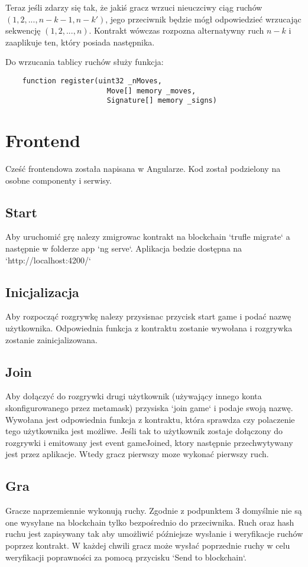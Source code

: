 \documentclass[a4paper, 12pt, onecolumn, one]{article}
\renewenvironment{thebibliography}[1]{%
\begin{oldthebibliography}{#1}%
\setlength{\parskip}{0ex}%
\setlength{\itemsep}{0.5ex} }%
{ \end{oldthebibliography} }
\begin{document}
	Teraz jeśli zdarzy się tak, że jakiś gracz wrzuci nieuczciwy ciąg ruchów \mbox{$(1,2,...,n-k-1,n-k')$}, jego przeciwnik będzie mógł odpowiedzieć wrzucając sekwencję \mbox{$(1,2,...,n)$}. Kontrakt wówczas rozpozna alternatywny ruch $n-k$ i zaaplikuje ten, który posiada następnika.
	
	Do wrzucania tablicy ruchów służy funkcja:
	\begin{lstlisting}
    function register(uint32 _nMoves,
                        Move[] memory _moves,
                        Signature[] memory _signs)
	\end{lstlisting}
 	
\section{Frontend}
	Cześć frontendowa została napisana w Angularze. Kod został podzielony na osobne componenty i serwisy.

\subsection{Start}
Aby uruchomić grę nalezy zmigrowac kontrakt na blockchain `trufle migrate` a następnie w folderze app `ng serve`. Aplikacja bedzie dostępna na `http://localhost:4200/`

\subsection{Inicjalizacja}
Aby rozpocząć rozgrywkę nalezy przysisnac przycisk start game i podać nazwę użytkownika. Odpowiednia funkcja z kontraktu zostanie wywołana i rozgrywka zostanie zainicjalizowana.

\subsection{Join}
Aby dołączyć do rozgrywki drugi użytkownik (używający innego konta skonfigurowanego przez metamask) przysiska `join game` i podaje swoją nazwę. Wywołana jest odpowiednia funkcja z kontraktu, która sprawdza czy polaczenie tego użytkownika jest możliwe. Jeśli tak to użytkownik zostaje dołączony do rozgrywki i  emitowany jest event gameJoined, ktory następnie przechwytywany jest przez aplikacje. Wtedy gracz pierwszy moze wykonać pierwszy ruch.

\subsection{Gra}
Gracze naprzemiennie wykonują ruchy. Zgodnie z podpunktem 3 domyślnie nie są one wysyłane na blockchain tylko bezpośrednio do przeciwnika. Ruch oraz hash ruchu jest zapisywany tak aby umożliwić późniejsze wysłanie i weryfikacje ruchów poprzez kontrakt. W każdej chwili gracz może wysłać poprzednie ruchy w celu weryfikacji poprawności za pomocą przycisku `Send to blockchain`. 
	
%	
\end{document}
